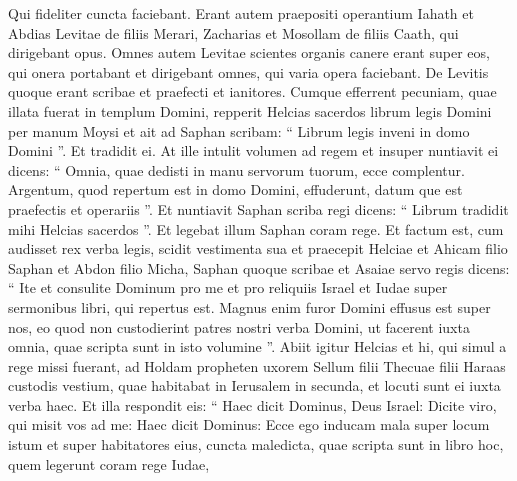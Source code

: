 \begin{biblechapter}
\begin{biblechapter}
\begin{biblechapter}
\begin{biblechapter}
\begin{biblechapter}
\begin{biblechapter}
\begin{biblechapter}
\begin{biblechapter}
\begin{biblechapter}
\begin{biblechapter}
\begin{biblechapter}
\begin{biblechapter}
\begin{biblechapter}
\begin{biblechapter}
\begin{biblechapter}
\begin{biblechapter}
\begin{biblechapter}
\begin{biblechapter}
\begin{biblechapter}
\begin{biblechapter}
\begin{biblechapter}
\begin{biblechapter}
\begin{biblechapter}
\begin{biblechapter}
\begin{biblechapter}
\begin{biblechapter}
\begin{biblechapter}
\begin{biblechapter}
\begin{biblechapter}
\begin{biblechapter}
\begin{biblechapter}
\begin{biblechapter}
\begin{biblechapter}
\begin{biblechapter}
\verse Qui fideliter cuncta faciebant. Erant autem praepositi operantium Iahath et Abdias Levitae de filiis Merari, Zacharias et Mosollam de filiis Caath, qui dirigebant opus. Omnes autem Levitae scientes organis canere 
\verse erant super eos, qui onera portabant et dirigebant omnes, qui varia opera faciebant. De Levitis quoque erant scribae et praefecti et ianitores.
 \verse Cumque efferrent pecuniam, quae illata fuerat in templum Domini, repperit Helcias sacerdos librum legis Domini per manum Moysi 
\verse et ait ad Saphan scribam: “ Librum legis inveni in domo Domini ”. Et tradidit ei. 
\verse At ille intulit volumen ad regem et insuper nuntiavit ei dicens: “ Omnia, quae dedisti in manu servorum tuorum, ecce complentur. 
\verse Argentum, quod repertum est in domo Domini, effuderunt, datum que est praefectis et operariis ”. 
\verse Et nuntiavit Saphan scriba regi dicens: “ Librum tradidit mihi Helcias sacerdos ”. Et legebat illum Saphan coram rege. 
\verse Et factum est, cum audisset rex verba legis, scidit vestimenta sua 
\verse et praecepit Helciae et Ahicam filio Saphan et Abdon filio Micha, Saphan quoque scribae et Asaiae servo regis dicens: 
\verse “ Ite et consulite Dominum pro me et pro reliquiis Israel et Iudae super sermonibus libri, qui repertus est. Magnus enim furor Domini effusus est super nos, eo quod non custodierint patres nostri verba Domini, ut facerent iuxta omnia, quae scripta sunt in isto volumine ”.
 \verse Abiit igitur Helcias et hi, qui simul a rege missi fuerant, ad Holdam propheten uxorem Sellum filii Thecuae filii Haraas custodis vestium, quae habitabat in Ierusalem in secunda, et locuti sunt ei iuxta verba haec. 
\verse Et illa respondit eis: “ Haec dicit Dominus, Deus Israel: Dicite viro, qui misit vos ad me: 
\verse Haec dicit Dominus: Ecce ego inducam mala super locum istum et super habitatores eius, cuncta maledicta, quae scripta sunt in libro hoc, quem legerunt coram rege Iudae, 

\end{biblechapter}
\end{biblechapter}
\end{biblechapter}
\end{biblechapter}
\end{biblechapter}
\end{biblechapter}
\end{biblechapter}
\end{biblechapter}
\end{biblechapter}
\end{biblechapter}
\end{biblechapter}
\end{biblechapter}
\end{biblechapter}
\end{biblechapter}
\end{biblechapter}
\end{biblechapter}
\end{biblechapter}
\end{biblechapter}
\end{biblechapter}
\end{biblechapter}
\end{biblechapter}
\end{biblechapter}
\end{biblechapter}
\end{biblechapter}
\end{biblechapter}
\end{biblechapter}
\end{biblechapter}
\end{biblechapter}
\end{biblechapter}
\end{biblechapter}
\end{biblechapter}
\end{biblechapter}
\end{biblechapter}
\end{biblechapter}
